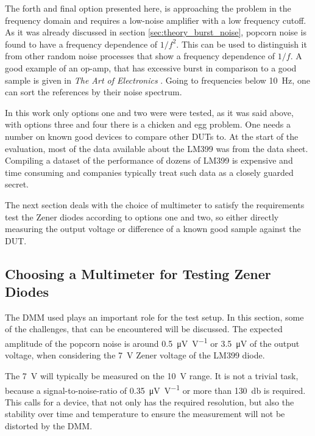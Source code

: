 The forth and final option presented here, is approaching the problem in the frequency domain and requires a low-noise amplifier with a low frequency cutoff. As it was already discussed in section \ref{sec:theory_burst_noise}, popcorn noise is found to have a frequency dependence of $1/f^2$. This can be used to distinguish it from other random noise processes that show a frequency dependence of $1/f$. A good example of an op-amp, that has excessive burst in comparison to a good sample is given in \textit{The Art of Electronics} \citep[p. 478]{horowitz1989}. Going to frequencies below \qty{10}{\Hz}, one can sort the references by their noise spectrum.

In this work only options one and two were were tested, as it was said above, with options three and four there is a chicken and egg problem. One needs a number on known good devices to compare other DUTs to. At the start of the evaluation, most of the data available about the LM399 was from the data sheet. Compiling a dataset of the performance of dozens of LM399 is expensive and time consuming and companies typically treat such data as a closely guarded secret.

The next section deals with the choice of multimeter to satisfy the requirements test the Zener diodes according to options one and two, so either directly measuring the output voltage or difference of a known good sample against the DUT.

\subsection{Choosing a Multimeter for Testing Zener Diodes}
The DMM used plays an important role for the test setup. In this section, some of the challenges, that can be encountered will be discussed. The expected amplitude of the popcorn noise is around \qty[per-mode=symbol]{0.5}{\micro\volt \per \volt} or \qty{3.5}{\micro\volt} of the output voltage, when considering the \qty{7}{\volt} Zener voltage of the LM399 diode.

The \qty{7}{\volt} will typically be measured on the \qty{10}{\volt} range. It is not a trivial task, because a signal-to-noise-ratio of \qty[per-mode=symbol]{0.35}{\micro\volt \per \volt} or more than \qty{130}{\decibel} is required. This calls for a device, that not only has the required resolution, but also the stability over time and temperature to ensure the measurement will not be distorted by the DMM.

